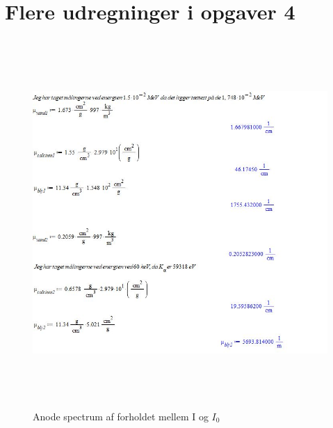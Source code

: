 \documentclass[a4paper,twoside]{article}
\begin{document}
\section{Flere udregninger i opgaver 4}
\begin{figure}[H]
\begin{centering}
\includegraphics[height=14cm]{Opgave 4.jpg}
\hspace{1cm}
\par\end{centering}
\caption{\label{cap:2ien} Anode spectrum af forholdet mellem I og $I_0$ }
\end{figure}
\end{document}
